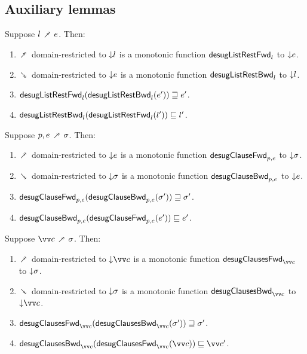 \subsection{Auxiliary lemmas}

\begin{lemma}
  \label{lem:aux:desugarlistrest:gc}
  Suppose $l \dfwdarrow e$. Then:
  \begin{enumerate}
     \item $\dfwdarrow$ domain-restricted to ${\downarrow}{l}$ is a monotonic function $\mathsf{desugListRestFwd}_{l}$ to ${\downarrow}{e}$.
     \item $\dbwdarrow$ domain-restricted to ${\downarrow}{e}$ is a monotonic function $\mathsf{desugListRestBwd}_{l}$ to ${\downarrow}{l}$.
     \item $\mathsf{desugListRestFwd}_{l}(\mathsf{desugListRestBwd}_{l}(e')) \sqsupseteq e'$.
     \item $\mathsf{desugListRestBwd}_{l}(\mathsf{desugListRestFwd}_{l}(l')) \sqsubseteq l'$.
  \end{enumerate}
\end{lemma}
\begin{lemma}
  \label{lem:aux:clause:gc}
  Suppose $p, e \dfwdarrow \sigma$. Then:
  \begin{enumerate}
     \item $\dfwdarrow$ domain-restricted to ${\downarrow}{e}$ is a monotonic function $\mathsf{desugClauseFwd}_{p, e}$ to ${\downarrow}{\sigma}$.
     \item $\dbwdarrow$ domain-restricted to ${\downarrow}{\sigma}$ is a monotonic function $\mathsf{desugClauseBwd}_{p, e}$ to ${\downarrow}{e}$.
     \item $\mathsf{desugClauseFwd}_{p, e}(\mathsf{desugClauseBwd}_{p, e}(\sigma')) \sqsupseteq \sigma'$.
     \item $\mathsf{desugClauseBwd}_{p, e}(\mathsf{desugClauseFwd}_{p, e}(e')) \sqsubseteq e'$.
  \end{enumerate}
\end{lemma}
\begin{lemma}
  \label{lem:aux:clauses:gc}
  Suppose $\vec{c} \dfwdarrow \sigma$. Then:
  \begin{enumerate}
     \item $\dfwdarrow$ domain-restricted to $\Below{\vec{c}}$ is a monotonic function $\desugarClausesFwdF{\vec{c}}$ to ${\downarrow}{\sigma}$.
     \item $\dbwdarrow$ domain-restricted to ${\downarrow}{\sigma}$ is a monotonic function $\desugarClausesBwdF{\vec{c}}$ to $\Below{\vec{c}}$.
     \item $\desugarClausesFwdF{\vec{c}}(\desugarClausesBwdF{\vec{c}}(\sigma')) \geq \sigma'$.
     \item $\desugarClausesBwdF{\vec{c}}(\desugarClausesFwdF{\vec{c}}(\vec{c})) \leq \vec{c}'$.
  \end{enumerate}
\end{lemma}
